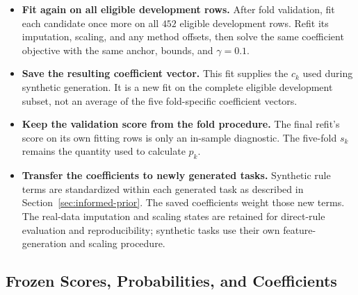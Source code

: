 \documentclass[11pt]{article}
\newenvironment{notes}
  {\begin{itemize}\setlength{\itemsep}{0.45em}\setlength{\parsep}{0pt}}
  {\end{itemize}}
\begin{document}
\begin{notes}
    \item \textbf{Fit again on all eligible development rows.}
    After fold validation, fit each candidate once more on
    all \(452\) eligible development rows. Refit its
    imputation, scaling, and any method offsets, then solve
    the same coefficient objective with the same anchor,
    bounds, and \(\gamma=0.1\).

    \item \textbf{Save the resulting coefficient vector.}
    This fit supplies the \(c_k\) used during synthetic
    generation. It is a new fit on the complete eligible
    development subset, not an average of the five
    fold-specific coefficient vectors.

    \item \textbf{Keep the validation score from the fold procedure.}
    The final refit's score on its own fitting rows is only
    an in-sample diagnostic. The five-fold \(s_k\) remains
    the quantity used to calculate \(p_k\).

    \item \textbf{Transfer the coefficients to newly generated tasks.}
    Synthetic rule terms are standardized within each generated
    task as described in Section~\ref{sec:informed-prior}.
    The saved coefficients weight those new terms.
    The real-data imputation and scaling states are retained
    for direct-rule evaluation and reproducibility; synthetic
    tasks use their own feature-generation and scaling procedure.
\end{notes}

\subsection{Frozen Scores, Probabilities, and Coefficients}
\label{sec:frozen-rule-results}
\end{document}
